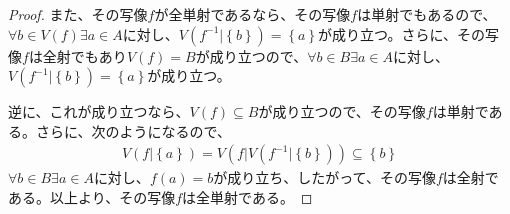 \documentclass[dvipdfmx]{jsarticle}
\begin{document}
\begin{proof}
また、その写像$f$が全単射であるなら、その写像$f$は単射でもあるので、$\forall b \in V(f)\exists a \in A$に対し、$V\left( f^{- 1}|\left\{ b \right\} \right) = \left\{ a \right\}$が成り立つ。さらに、その写像$f$は全射でもあり$V(f) = B$が成り立つので、$\forall b \in B\exists a \in A$に対し、$V\left( f^{- 1}|\left\{ b \right\} \right) = \left\{ a \right\}$が成り立つ。\par
逆に、これが成り立つなら、$V(f) \subseteq B$が成り立つので、その写像$f$は単射である。さらに、次のようになるので、
\begin{align*}
V\left( f|\left\{ a \right\} \right) = V\left( f|V\left( f^{- 1}|\left\{ b \right\} \right) \right) \subseteq \left\{ b \right\}
\end{align*}
$\forall b \in B\exists a \in A$に対し、$f(a) = b$が成り立ち、したがって、その写像$f$は全射である。以上より、その写像$f$は全単射である。
\end{proof}
\end{document}
